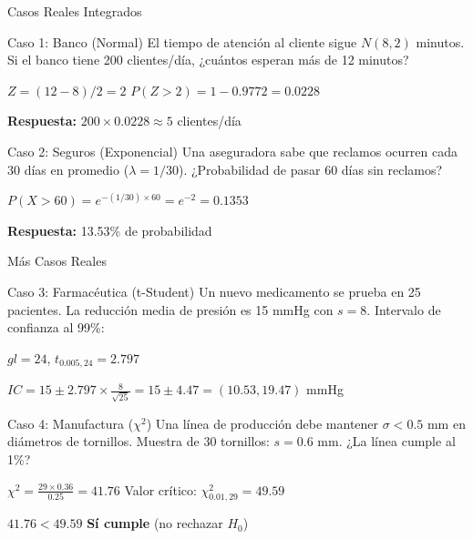 \documentclass[10pt]{beamer}
\begin{document}
\begin{frame}{Casos Reales Integrados}
\begin{exampleblock}{Caso 1: Banco (Normal)}
\footnotesize
El tiempo de atención al cliente sigue $N(8, 2)$ minutos. Si el banco tiene 200 clientes/día, ¿cuántos esperan más de 12 minutos?

$Z = (12-8)/2 = 2$ \quad $P(Z > 2) = 1 - 0.9772 = 0.0228$

\textbf{Respuesta:} $200 \times 0.0228 \approx 5$ clientes/día
\end{exampleblock}

\begin{exampleblock}{Caso 2: Seguros (Exponencial)}
\footnotesize
Una aseguradora sabe que reclamos ocurren cada 30 días en promedio ($\lambda = 1/30$). ¿Probabilidad de pasar 60 días sin reclamos?

$P(X > 60) = e^{-(1/30) \times 60} = e^{-2} = 0.1353$

\textbf{Respuesta:} 13.53\% de probabilidad
\end{exampleblock}
\end{frame}

\begin{frame}{Más Casos Reales}
\begin{exampleblock}{Caso 3: Farmacéutica (t-Student)}
\footnotesize
Un nuevo medicamento se prueba en 25 pacientes. La reducción media de presión es 15 mmHg con $s = 8$. Intervalo de confianza al 99\%:

$gl = 24$, $t_{0.005, 24} = 2.797$

$IC = 15 \pm 2.797 \times \frac{8}{\sqrt{25}} = 15 \pm 4.47 = (10.53, 19.47)$ mmHg
\end{exampleblock}

\begin{exampleblock}{Caso 4: Manufactura ($\chi^2$)}
\footnotesize
Una línea de producción debe mantener $\sigma < 0.5$ mm en diámetros de tornillos. Muestra de 30 tornillos: $s = 0.6$ mm. ¿La línea cumple al 1\%?

$\chi^2 = \frac{29 \times 0.36}{0.25} = 41.76$ \quad Valor crítico: $\chi^2_{0.01, 29} = 49.59$

$41.76 < 49.59$ \quad \textbf{Sí cumple} (no rechazar $H_0$)
\end{exampleblock}
\end{frame}
\end{document}
